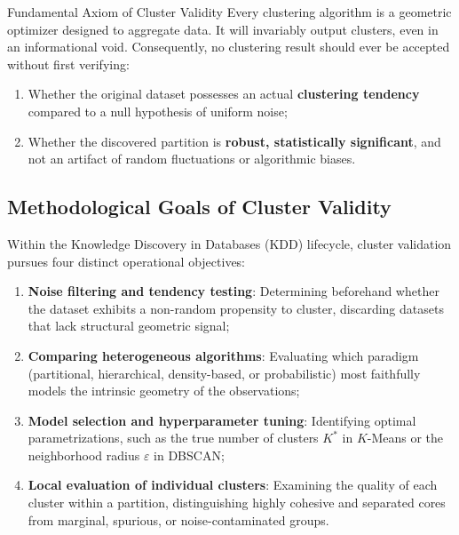\begin{alertblock}{Fundamental Axiom of Cluster Validity}
Every clustering algorithm is a geometric optimizer designed to aggregate data. It will invariably output clusters, even in an informational void. Consequently, no clustering result should ever be accepted without first verifying:
\begin{enumerate}[noitemsep]
    \item Whether the original dataset possesses an actual \textbf{clustering tendency} compared to a null hypothesis of uniform noise;
    \item Whether the discovered partition is \textbf{robust, statistically significant}, and not an artifact of random fluctuations or algorithmic biases.
\end{enumerate}
\end{alertblock}

\subsection{Methodological Goals of Cluster Validity}
Within the Knowledge Discovery in Databases (KDD) lifecycle, cluster validation pursues four distinct operational objectives:
\begin{enumerate}
    \item \textbf{Noise filtering and tendency testing}: Determining beforehand whether the dataset exhibits a non-random propensity to cluster, discarding datasets that lack structural geometric signal;
    \item \textbf{Comparing heterogeneous algorithms}: Evaluating which paradigm (partitional, hierarchical, density-based, or probabilistic) most faithfully models the intrinsic geometry of the observations;
    \item \textbf{Model selection and hyperparameter tuning}: Identifying optimal parametrizations, such as the true number of clusters $K^*$ in $K$-Means or the neighborhood radius $\varepsilon$ in DBSCAN;
    \item \textbf{Local evaluation of individual clusters}: Examining the quality of each cluster within a partition, distinguishing highly cohesive and separated cores from marginal, spurious, or noise-contaminated groups.
\end{enumerate}

